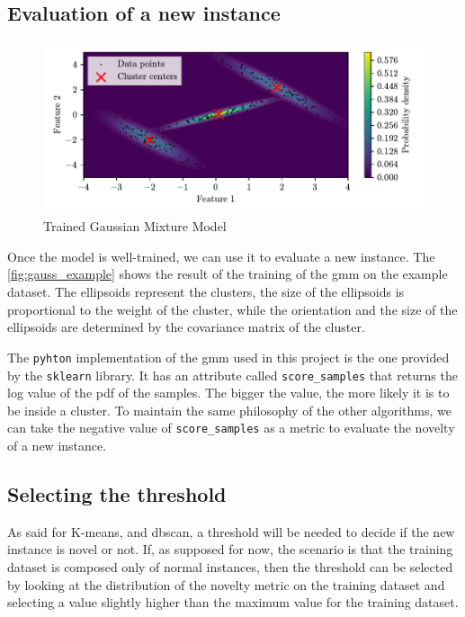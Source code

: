 \subsection{Evaluation of a new instance}
\label{sec:gauss_eval}
\begin{figure}
    \centering
    \includegraphics{images/Gaussian/Figure_2.pdf}
    \caption{Trained Gaussian Mixture Model}
    \label{fig:gauss_example}
\end{figure}
Once the model is well-trained, we can use it to evaluate a new instance. The \autoref{fig:gauss_example} shows the result of the training of the \gls{gmm} on the example dataset. The ellipsoids represent the clusters, the size of the ellipsoids is proportional to the weight of the cluster, while the orientation and the size of the ellipsoids are determined by the covariance matrix of the cluster. 

The \texttt{pyhton} implementation of the \gls{gmm} used in this project is the one provided by the \texttt{sklearn} library. It has an attribute called \texttt{score\_samples} that returns the log value of the \gls{pdf} of the samples.
The bigger the value, the more likely it is to be inside a cluster. 
To maintain the same philosophy of the other algorithms, we can take the negative value of \texttt{score\_samples} as a metric to evaluate the novelty of a new instance. 

\subsection{Selecting the threshold}
As said for K-means, and \gls{dbscan}, a threshold will be needed to decide if the new instance is novel or not. If, as supposed for now, the scenario is that the training dataset is composed only of normal instances, then the threshold can be selected by looking at the distribution of the novelty metric on the training dataset and selecting a value slightly higher than the maximum value for the training dataset.

